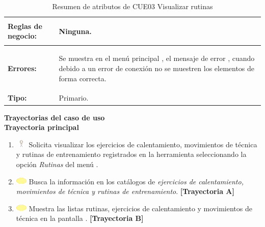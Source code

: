 \begin{table}[H]
\begin{tabular}{| l | p{12 cm} |}
\hline
\textbf{Reglas de negocio:} & \vspace{-2mm}	%
							\begin{compactitem}
								\item Ninguna.
							\end{compactitem}\\							
\hline
\textbf{Errores:} &	\vspace{-2mm}	%
					\begin{compactitem}
						\setlength\itemsep{-0.25em}
						\item  Se muestra en el menú principal \nameref{menu:ME01}, el mensaje de error \nameref{msj:MSG24}, cuando debido a un error de conexión no se muestren los elementos de forma correcta.
					\end{compactitem}\\
\hline
\textbf{Tipo:} & Primario.\\
\hline	
\end{tabular}
\caption{Resumen de atributos de CUE03 Visualizar rutinas}
\label{tab:CUE03}
\end{table} 

\textbf{\textcolor[rgb]{0, 0, 0.545098}{Trayectorias del caso de uso}} \\

\textbf{\large{Trayectoria principal}}

\begin{enumerate}
	\item \includegraphics[width=15pt, height=10pt]{./Figuras/iconosCU/usuario.png} Solicita visualizar los ejercicios de calentamiento, movimientos de técnica y rutinas de entrenamiento registrados en la herramienta seleccionando la opción \textit{Rutinas} del menú .
	\item \includegraphics[width=15pt]{./Figuras/iconosCU/herramienta.png} Busca la información en los catálogos de \textit{ejercicios de calentamiento, movimientos de técnica y rutinas de entrenamiento}. \textbf{[Trayectoria A]}
	\item \includegraphics[width=15pt]{./Figuras/iconosCU/herramienta.png} Muestra las listas rutinas, ejercicios de calentamiento y movimientos de técnica en la pantalla . \textbf{[Trayectoria B]}
\end{enumerate}
	
